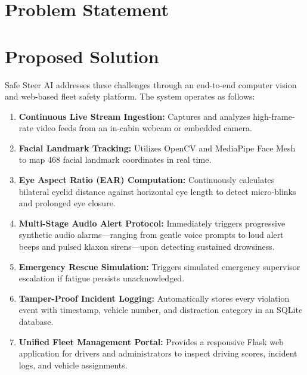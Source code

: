 \documentclass[a4paper,12pt]{report}
\begin{document}
\section{Problem Statement}
\begin{center}
\end{center}

\section{Proposed Solution}
\par
Safe Steer AI addresses these challenges through an end-to-end computer vision and web-based fleet safety platform. The system operates as follows:
\begin{enumerate}
    \item \textbf{Continuous Live Stream Ingestion:} Captures and analyzes high-frame-rate video feeds from an in-cabin webcam or embedded camera.
    \item \textbf{Facial Landmark Tracking:} Utilizes OpenCV and MediaPipe Face Mesh to map 468 facial landmark coordinates in real time.
    \item \textbf{Eye Aspect Ratio (EAR) Computation:} Continuously calculates bilateral eyelid distance against horizontal eye length to detect micro-blinks and prolonged eye closure.
    \item \textbf{Multi-Stage Audio Alert Protocol:} Immediately triggers progressive synthetic audio alarms—ranging from gentle voice prompts to loud alert beeps and pulsed klaxon sirens—upon detecting sustained drowsiness.
    \item \textbf{Emergency Rescue Simulation:} Triggers simulated emergency supervisor escalation if fatigue persists unacknowledged.
    \item \textbf{Tamper-Proof Incident Logging:} Automatically stores every violation event with timestamp, vehicle number, and distraction category in an SQLite database.
    \item \textbf{Unified Fleet Management Portal:} Provides a responsive Flask web application for drivers and administrators to inspect driving scores, incident logs, and vehicle assignments.
\end{enumerate}
\end{document}

